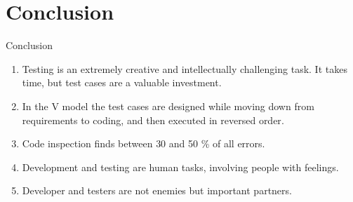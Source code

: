 \section*{Conclusion}

\begin{frame}{Conclusion}
  \begin{enumerate}
    \item Testing is an \alert{extremely creative and intellectually challenging task}. It takes time, but test cases are a \alert{valuable investment}.
    \item In the V model the test cases are \alert{designed while moving down} from requirements to coding, and then \alert{executed in reversed order}.
    \item Code inspection finds between \alert{30 and 50 \% of all errors}.
    \item Development and testing are \alert{human tasks}, involving \alert{people with feelings}.
    \item Developer and testers are \alert{not enemies but important partners}.
  \end{enumerate}
\end{frame}